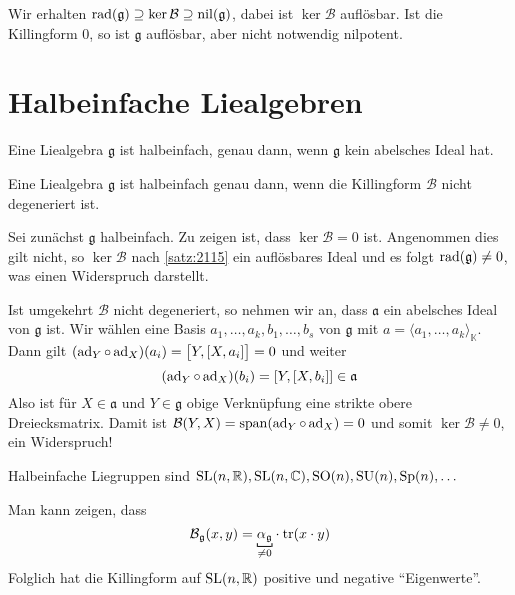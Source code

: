 Wir erhalten $\rad(\mathfrak{g}) \supseteq \ker \mathcal{B} \supseteq \nil(\mathfrak{g})$, dabei ist $\ker \mathcal{B}$ auflösbar.
Ist die Killingform $0$, so ist $\mathfrak{g}$ auflösbar, aber nicht notwendig nilpotent.

\section{Halbeinfache Liealgebren} %
\label{sec:22}

\begin{erinnerung}
	Eine Liealgebra $\mathfrak{g}$ ist halbeinfach, genau dann, wenn $\mathfrak{g}$ kein abelsches Ideal hat.
\end{erinnerung}

\begin{satz}[{name={Cartan}}]
	Eine Liealgebra $\mathfrak{g}$ ist halbeinfach genau dann, wenn die Killingform $\mathcal{B}$ nicht degeneriert ist.
\end{satz}
\begin{beweis}
	Sei zunächst $\mathfrak{g}$ halbeinfach.
	Zu zeigen ist, dass $\ker \mathcal{B}= 0$ ist.
	Angenommen dies gilt nicht, so $\ker \mathcal{B}$ nach \autoref{satz:2115} ein auflösbares Ideal und es folgt $\rad(\mathfrak{g}) \neq 0$, was einen Widerspruch darstellt.
	
	Ist umgekehrt $\mathcal{B}$ nicht degeneriert, so nehmen wir an, dass $\mathfrak{a}$ ein abelsches Ideal von $\mathfrak{g}$ ist.
	Wir wählen eine Basis $a_1, \ldots ,a_k, b_1, \ldots ,b_s$ von $\mathfrak{g}$ mit $a = \langle a_1, \ldots , a_k\rangle_\mathbb{K}$.
	Dann gilt $(\ad_Y \circ \ad_X)(a_i) = \benbrace[\big]{Y,\benbrace*{X,a_i}} = 0$ und weiter
	\[
		\enbrace*{\ad_Y \circ \ad_X}(b_i) = \benbrace*{Y, \benbrace*{X,b_i}} \in  \mathfrak{a}
	\]
	Also ist für $X \in \mathfrak{a}$ und $Y \in \mathfrak{g}$ obige Verknüpfung eine strikte obere Dreiecksmatrix.
	Damit ist $\mathcal{B}(Y,X)= \Span (\ad_Y \circ \ad_X)=0$ und somit $\ker \mathcal{B} \neq 0$, ein Widerspruch!
\end{beweis}

Halbeinfache Liegruppen sind $\SL(n,\mathbb{R}), \SL(n,\mathbb{C}), \SO(n), \SU(n), \Sp(n), \ldots $

Man kann zeigen, dass 
\[
	\mathcal{B}_{\mathfrak{g}} \enbrace*{x,y} = \Underbracket{\alpha_\mathfrak{g}}{\neq 0} \cdot \tr(x \cdot y)
\]
Folglich hat die Killingform auf $\SL(n,\mathbb{R})$ positive und negative \enquote{Eigenwerte}.

